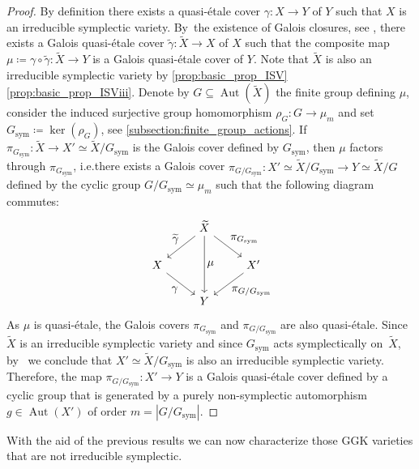 \documentclass[10pt]{amsart}
\newcommand{\ie}{i.e.}
\let\ts\textstyle
\theoremstyle{plain}
\theoremstyle{definition}
\DeclareMathOperator{\Aut}{Aut}
\begin{document}
\begin{proof}
By definition there exists a quasi-étale cover $\gamma\colon X\to Y$ of $Y$ such that $X$ is an irreducible symplectic variety. By~the existence of Galois closures, see \cite[Th.\,3.7]{GKP16a}, there exists a Galois quasi-étale cover $\widetilde{\gamma}\colon \widetilde{X}\to X$ of $X$ such that the composite map $\mu\coloneqq \gamma \circ \widetilde{\gamma} \colon \widetilde{X}\to Y$ is a Galois quasi-étale cover of $Y$. Note that $\widetilde{X}$ is also an irreducible symplectic variety by \autoref{prop:basic_prop_ISV}\eqref{prop:basic_prop_ISViii}.
Denote by $G \subseteq \Aut(\widetilde{X})$ the finite group defining $\mu$, consider the induced surjective group homomorphism $\rho_G\colon G\to \mu_m$ and set $ G_\text{sym} \coloneqq \ker(\rho_G)$, see \autoref{subsection:finite_group_actions}.
If $\pi_{G_\text{sym}} \colon \widetilde{X}\to X' \simeq \widetilde{X}/{G_\text{sym}}$ is the Galois cover defined by $G_\text{sym}$, then $\mu$ factors through $\pi_{G_\text{sym}}$, \ie there exists a Galois cover $\pi_{G/G_\text{sym}}\colon X' \simeq \widetilde{X}/{G_\text{sym}} \to Y \simeq \widetilde{X}/G$ defined by the cyclic group $G/{G_\text{sym}}\simeq \mu_m$
such that the following diagram commutes:
\[
\begin{tikzcd}
& \widetilde{X} \arrow[ld, "\ts \widetilde \gamma"'] \arrow[rd, "\ts \pi_{G_\text{sym}}"] \arrow[dd, "\ts \mu"]& \\
X \arrow[rd, "\ts \gamma"'] & & X' \arrow[ld, "\ts \pi_{G/G_\text{sym}}"] \\
& Y &
\end{tikzcd}
\]
As $\mu$ is quasi-étale, the Galois covers $\pi_{G_\text{sym}}$ and $\pi_{G/{G_\text{sym}}}$ are also quasi-étale. Since~$\widetilde{X}$ is an irreducible symplectic variety and since $G_\text{sym}$ acts symplectically on~$\widetilde{X}$, by~\cite[Prop.\,3.17]{BGMM25} we conclude that $X' \simeq \widetilde{X}/{G_\text{sym}}$ is also an irreducible symplectic variety.
Therefore, the map $\pi_{G/{G_{\text{sym}}}} \colon X'\to Y $ is a Galois quasi-étale cover defined by a cyclic group that is generated by a purely non-symplectic automorphism $g \in \Aut(X')$ of order $m=| G / G_\text{sym} |$.
\end{proof}

With the aid of the previous results we can now characterize those GGK varieties that are not irreducible symplectic.
\end{document}

